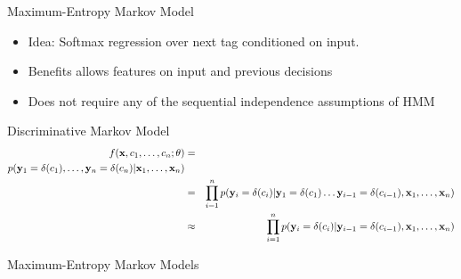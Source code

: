 \documentclass{beamer}
\begin{document}
\begin{frame}{Maximum-Entropy Markov Model}
  \begin{itemize}
  \item Idea: Softmax regression over next tag conditioned on input. 
    \air
    
  \item Benefits allows features on input and previous decisions
    \air
 
  \item Does not require any of the sequential independence assumptions of HMM
  \end{itemize}
\end{frame}

\begin{frame}{Discriminative Markov Model}
  \begin{eqnarray*}
    f(\mathbf{x}, c_1, \ldots, c_n; \theta) &=& \\ p(\mathbf{y}_1=\delta(c_1), \ldots, \mathbf{y}_n=\delta(c_n) | \mathbf{x}_1, \ldots, \mathbf{x}_n)  \\
    &=& \prod_{i=1}^n p(\mathbf{y}_i=\delta(c_i) | \mathbf{y}_1=\delta(c_1) \ldots \mathbf{y}_{i-1}=\delta(c_{i-1}), \mathbf{x}_1, \ldots, \mathbf{x}_n) \\
    &\approx& \prod_{i=1}^n p(\mathbf{y}_i=\delta(c_i) | \mathbf{y}_{i-1}=\delta(c_{i-1}) , \mathbf{x}_1, \ldots, \mathbf{x}_n) \\
  \end{eqnarray*}
\end{frame}



\begin{frame}{Maximum-Entropy Markov Models}
\begin{center}  
\end{center}  
\end{frame}
\end{document}
